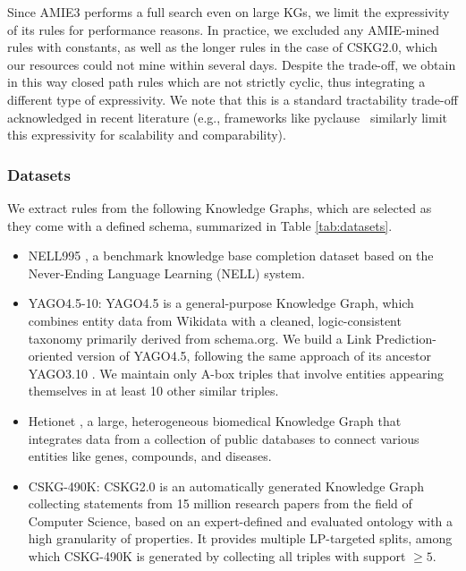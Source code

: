 \documentclass[a4paper,UKenglish,cleveref, autoref, thm-restate]{tgdk-v2021}
\begin{document}
\noindent Since AMIE3 performs a full search even on large KGs, we limit the expressivity of its rules for performance reasons. In practice, we excluded any AMIE-mined rules with constants, as well as the longer rules in the case of CSKG2.0, which our resources could not mine within several days. Despite the trade-off, we obtain in this way closed path rules which are not strictly cyclic, thus integrating a different type of expressivity. We note that this is a standard tractability trade-off acknowledged in recent literature (e.g., frameworks like pyclause~\cite{betz_pyclause_2024} similarly limit this expressivity for scalability and comparability).

\subsubsection{Datasets} We extract rules from the following Knowledge Graphs, which are selected as they come with a defined schema, summarized in Table \ref{tab:datasets}. 

\begin{itemize}
    \item NELL995 \cite{xiong_deeppath_2017}, a benchmark knowledge base completion dataset based on the Never-Ending Language Learning (NELL) system.
    \item YAGO4.5-10: YAGO4.5 \cite{suchanek_yago_2024} is a general-purpose Knowledge Graph, which combines entity data from Wikidata with a cleaned, logic-consistent taxonomy primarily derived from schema.org. We build a Link Prediction-oriented version of YAGO4.5, following the same approach of its ancestor YAGO3.10 \cite{dettmers_convolutional_2018}.  We maintain only A-box triples that involve entities appearing themselves in at least 10 other similar triples. 
    \item Hetionet \cite{himmelstein_systematic_2017}, a large, heterogeneous biomedical Knowledge Graph that integrates data from a collection of public databases to connect various entities like genes, compounds, and diseases.
    \item CSKG-490K: CSKG2.0 \cite{dessi_cs-kg_2025} is an automatically generated Knowledge Graph collecting statements from 15 million research papers from the field of Computer Science, based on an expert-defined and evaluated ontology with a high granularity of properties. It provides multiple LP-targeted splits, among which CSKG-490K is generated by collecting all triples with support $\geq5$.
\end{itemize}
\end{document}
